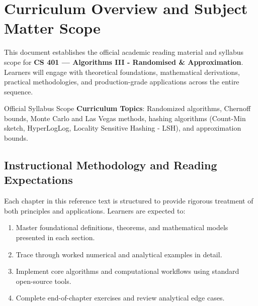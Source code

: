 \section{Curriculum Overview and Subject Matter Scope}

This document establishes the official academic reading material and syllabus scope for \textbf{CS 401 --- Algorithms III - Randomised \& Approximation}. Learners will engage with theoretical foundations, mathematical derivations, practical methodologies, and production-grade applications across the entire sequence.

\begin{InsightBox}{Official Syllabus Scope}
  \textbf{Curriculum Topics}: Randomized algorithms, Chernoff bounds, Monte Carlo and Las Vegas methods, hashing algorithms (Count-Min sketch, HyperLogLog, Locality Sensitive Hashing - LSH), and approximation bounds.
\end{InsightBox}

\subsection{Instructional Methodology and Reading Expectations}

Each chapter in this reference text is structured to provide rigorous treatment of both principles and applications. Learners are expected to:
\begin{enumerate}
  \item Master foundational definitions, theorems, and mathematical models presented in each section.
  \item Trace through worked numerical and analytical examples in detail.
  \item Implement core algorithms and computational workflows using standard open-source tools.
  \item Complete end-of-chapter exercises and review analytical edge cases.
\end{enumerate}


